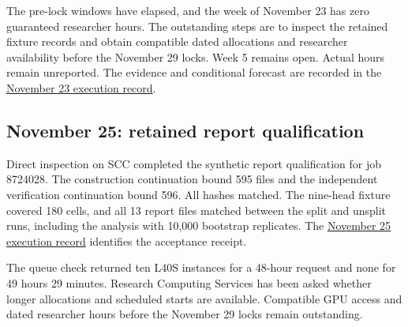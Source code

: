 The pre-lock windows have elapsed, and the week of November 23 has zero
guaranteed researcher hours. The outstanding steps are to inspect the retained
fixture records and obtain compatible dated allocations and researcher
availability before the November 29 locks. Week 5 remains open. Actual hours
remain unreported. The evidence and conditional forecast are recorded in the
\href{https://github.com/JJCAPPE/pose-embedding/blob/main/docs/protocol/week-5-execution.md\#november-23-report-qualification-and-capacity-review}{November 23 execution record}.

\subsection*{November 25: retained report qualification}

Direct inspection on SCC completed the synthetic report qualification for job
8724028. The construction continuation bound 595 files and the independent
verification continuation bound 596. All hashes matched. The nine-head fixture
covered 180 cells, and all 13 report files matched between the split and unsplit
runs, including the analysis with 10,000 bootstrap replicates. The
\href{https://github.com/JJCAPPE/pose-embedding/blob/main/docs/protocol/week-5-execution.md\#november-25-retained-report-qualification}{November 25 execution record}
identifies the acceptance receipt.

The queue check returned ten L40S instances for a 48-hour request and none for
49 hours 29 minutes. Research Computing Services has been asked whether longer
allocations and scheduled starts are available. Compatible GPU access and dated
researcher hours before the November 29 locks remain outstanding.
